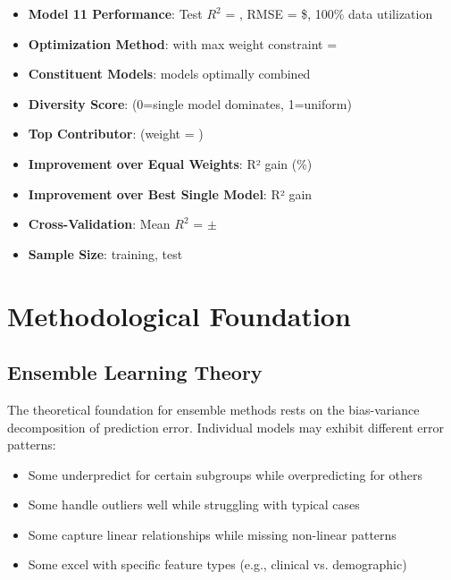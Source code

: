 \begin{itemize}
    \item \textbf{Model 11 Performance}: Test $R^2$ = \ModelElevenRSquaredTest{}, RMSE = \$\ModelElevenRMSETest{}, 100\% data utilization
    \item \textbf{Optimization Method}: \ModelElevenMethod{} with max weight constraint = \ModelElevenMaxWeight{}
    \item \textbf{Constituent Models}: \ModelElevenModelsIncluded{} models optimally combined
    \item \textbf{Diversity Score}: \ModelElevenDiversityScore{} (0=single model dominates, 1=uniform)
    \item \textbf{Top Contributor}: \ModelElevenTopContributor{} (weight = \ModelElevenTopWeight{})
    \item \textbf{Improvement over Equal Weights}: \ModelElevenImprovementOverEqual{} R² gain (\ModelElevenImprovementPct{}\%)
    \item \textbf{Improvement over Best Single Model}: \ModelElevenImprovementVsBest{} R² gain
    \item \textbf{Cross-Validation}: Mean $R^2$ = \ModelElevenCVMean{} $\pm$ \ModelElevenCVStd{}
    \item \textbf{Sample Size}: \ModelElevenTrainingSamples{} training, \ModelElevenTestSamples{} test
\end{itemize}

\section{Methodological Foundation}

\subsection{Ensemble Learning Theory}

The theoretical foundation for ensemble methods rests on the bias-variance decomposition of prediction error. Individual models may exhibit different error patterns:
\begin{itemize}
    \item Some underpredict for certain subgroups while overpredicting for others
    \item Some handle outliers well while struggling with typical cases
    \item Some capture linear relationships while missing non-linear patterns
    \item Some excel with specific feature types (e.g., clinical vs. demographic)
\end{itemize}


